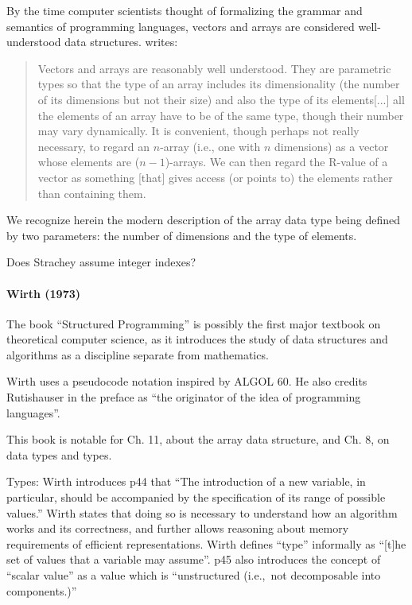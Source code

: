 By the time computer scientists thought of formalizing the grammar and semantics of programming languages,
vectors and arrays are considered well-understood data structures. \cite[\S 3.7.7, pp. 43--44]{Strachey1967} writes:
\begin{quote}
Vectors and arrays are reasonably well understood. They are parametric types so that the type of an array includes its dimensionality (the number of
its dimensions but not their size) and also the type of its elements[...]
all the elements of an array have to be of the same type, though their number may vary dynamically.
It is convenient, though perhaps not really necessary, to regard an $n$-array
(i.e., one with $n$ dimensions) as a vector whose elements are ($n-1$)-arrays.
We can then regard the R-value of a vector as something [that] gives access (or points to) the elements rather than containing them.
\end{quote}
We recognize herein the modern description of the array data type being defined by
two parameters: the number of dimensions and the type of elements.

Does Strachey assume integer indexes?


\paragraph{Wirth (1973)~\cite{Wirth1973}}

The book ``Structured Programming'' is possibly the first major textbook on theoretical computer science, as it introduces the study of data structures and algorithms as a discipline separate from mathematics.

Wirth uses a pseudocode notation inspired by ALGOL 60. He also credits Rutishauser
in the preface as ``the originator of the idea of programming languages''.

This book is notable for Ch. 11, about the array data structure, and Ch. 8, on data types and types.

Types: Wirth introduces p44 that ``The introduction of a new variable, in particular,
should be accompanied by the specification of
its range of possible values.'' Wirth states that doing so is necessary to understand
how an algorithm works and its correctness, and further allows reasoning about memory requirements
of efficient representations.
Wirth defines ``type'' informally as ``[t]he set of values that a variable may
assume''. p45 also introduces the concept of ``scalar value'' as a value
which is ``unstructured (i.e.,\ not decomposable into components.)''


